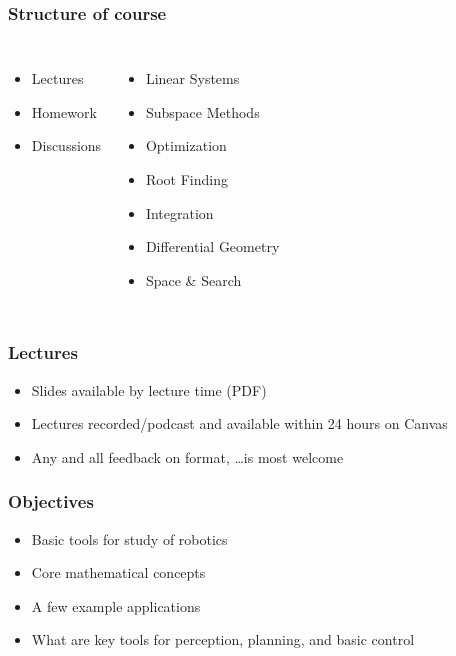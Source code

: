 \documentclass[10pt]{beamer}
\begin{document}
\begin{frame}
  \frametitle{Structure of course}
  \begin{columns}
    \column{5cm}
    \begin{itemize}
    \item Lectures
    \item Homework
    \item Discussions
    \end{itemize}\pause
    \column{5cm}
    \begin{itemize}
    \item Linear Systems
    \item Subspace Methods
    \item Optimization
    \item Root Finding
    \item Integration
    \item Differential Geometry
    \item Space \& Search
    \end{itemize}
  \end{columns}
\end{frame}

\begin{frame}
  \frametitle{Lectures}
  \begin{itemize}
    \item Slides available by lecture time (PDF)
    \item Lectures recorded/podcast and available within 24 hours on Canvas
    \item Any and all feedback on format, \ldots is most welcome
  \end{itemize}
\end{frame}

\begin{frame}
  \frametitle{Objectives}
  \begin{itemize}
  \item Basic tools for study of robotics
  \item Core mathematical concepts
  \item A few example applications
  \item What are key tools for perception, planning, and basic control
  \end{itemize}
\end{frame}
\end{document}
